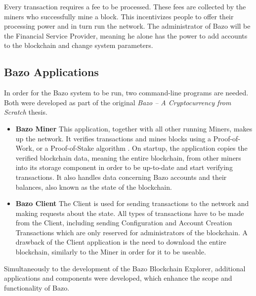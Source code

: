 Every transaction requires a fee to be processed. These fees are collected by the miners who successfully mine a block. This incentivizes people to offer their processing power and in turn run the network. The administrator of Bazo will be the Financial Service Provider, meaning he alone has the power to add accounts to the blockchain and change system parameters. \\

\subsection{Bazo Applications}
In order for the Bazo system to be run, two command-line programs are needed. Both were developed as part of the original \emph{Bazo -- A Cryptocurrency from Scratch} \cite{bazo} thesis.

\begin{itemize}
\item \textbf{Bazo Miner}
This application, together with all other running Miners, makes up the network. It verifies transactions and mines blocks using a Proof-of-Work, or a Proof-of-Stake algorithm \cite{pos}. On startup, the application copies the verified blockchain data, meaning the entire blockchain, from other miners into its storage component in order to be up-to-date and start verifying transactions. It also handles data concerning Bazo accounts and their balances, also known as the state of the blockchain.

\item \textbf{Bazo Client}
The Client is used for sending transactions to the network and making requests about the state. All types of transactions have to be made from the Client, including sending Configuration and Account Creation Transactions which are only reserved for administrators of the blockchain. A drawback of the Client application is the need to download the entire blockchain, similarly to the Miner in order for it to be useable.
\end{itemize}

Simultaneously to the development of the Bazo Blockchain Explorer, additional applications and components were developed, which enhance the scope and functionality of Bazo. 

